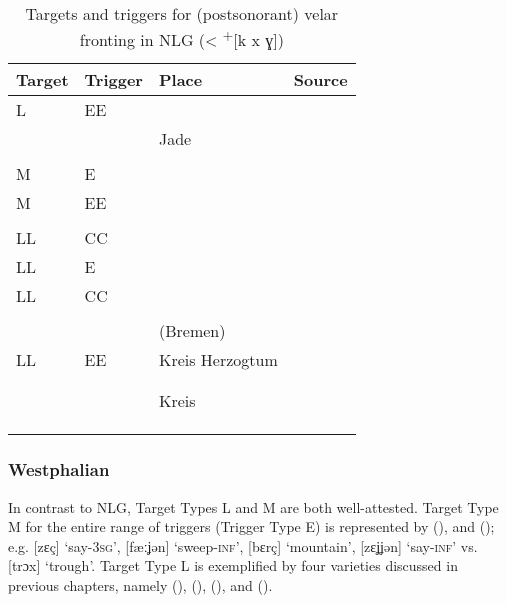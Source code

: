 \begin{table}
\caption{Targets and triggers for (postsonorant) velar fronting in NLG (< \textsuperscript{+}[k x ɣ])\label{tab:12.14}}

\begin{tabularx}{\textwidth}{llQQ}
\lsptoprule
Target  & Trigger & Place & Source\\\midrule
L & EE &   & \citet{Götze1922}\\
  &    & Jade        & \citet{Götze1922} \\
  &    &     & \citet{Schmidt-Brockhoff1943}\\
M & E &   & \citet{Schmeding1937}\\
M & EE &     & \citet{Vehslage1908}\\
  &    &  & \citet{Sievers1914}\\
LL & CC &   & \citet{Rabeler1911}\\
LL & E &   &  \citet{vorMohr1904}\\
LL & CC &                  & \citet{Larsson1917}\\
   &    &            & \citet{Kloeke1914} \\
   &    &   (Bremen) & \citet{Bollmann1942}\\
LL & EE & Kreis Herzogtum & \citet{Heigener1937}    \\
   &    &                & \citet{Pühn1956}        \\
   &    &                    & \citet{Keller1961}      \\
   &    & Kreis                & \citet{BethgeBonnin1969}\\
   &    &      & \citet{Mews1971}\\
   &    &      & \citet{Willkommen1999}\\
\lspbottomrule
\end{tabularx}
\end{table}

\subsubsection{Westphalian}\largerpage
In contrast to NLG, Target Types L and M are both well-attested. Target Type M for the entire range of triggers (Trigger Type E) is represented by  (), and  (); e.g.  [zɛç] ‘say\textsc{{}-3sg}’, [fæːʝən] ‘sweep\textsc{{}-inf}’, [bɛrç] ‘mountain’, [zɛʝʝən] ‘say\textsc{{}-inf}’ vs. [trɔx] ‘trough’. Target Type L is exemplified by four varieties discussed in previous chapters, namely  (),  (),  (), and  ().

